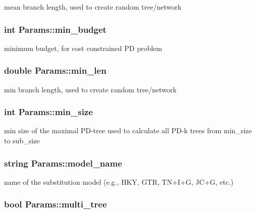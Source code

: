 \label{structParams_ae0161060ce510ef5c0d4c190f04d612a}
mean branch length, used to create random tree/network \hypertarget{structParams_a079ae51c87f97bfe3e2b4aa3551f673e}{
\subsubsection[{min\_\-budget}]{\setlength{\rightskip}{0pt plus 5cm}int {\bf Params::min\_\-budget}}}
\label{structParams_a079ae51c87f97bfe3e2b4aa3551f673e}
minimum budget, for cost constrained PD problem \hypertarget{structParams_aacbf6830829833568038fa4731d348a9}{
\subsubsection[{min\_\-len}]{\setlength{\rightskip}{0pt plus 5cm}double {\bf Params::min\_\-len}}}
\label{structParams_aacbf6830829833568038fa4731d348a9}
min branch length, used to create random tree/network \hypertarget{structParams_a3c78c1ab3fab2a470ea7e39a8dd9e4ca}{
\subsubsection[{min\_\-size}]{\setlength{\rightskip}{0pt plus 5cm}int {\bf Params::min\_\-size}}}
\label{structParams_a3c78c1ab3fab2a470ea7e39a8dd9e4ca}
min size of the maximal PD-\/tree used to calculate all PD-\/k trees from min\_\-size to sub\_\-size \hypertarget{structParams_a3f8a82796a96decaefc07154b58565cf}{
\subsubsection[{model\_\-name}]{\setlength{\rightskip}{0pt plus 5cm}string {\bf Params::model\_\-name}}}
\label{structParams_a3f8a82796a96decaefc07154b58565cf}
name of the substitution model (e.g., HKY, GTR, TN+I+G, JC+G, etc.) \hypertarget{structParams_a3d87d2c85fac27e211f2877ba5f48d76}{
\subsubsection[{multi\_\-tree}]{\setlength{\rightskip}{0pt plus 5cm}bool {\bf Params::multi\_\-tree}}}
